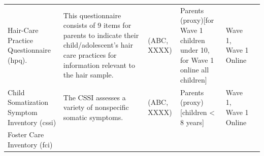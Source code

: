 \documentclass[]{book}
\begin{document}
\begin{longtable}[]{@{}llllll@{}}
\begin{minipage}[t]{0.18\columnwidth}\raggedright
Hair-Care Practice Questionnaire (hpq).\strut
\end{minipage} & \begin{minipage}[t]{0.18\columnwidth}\raggedright
This questionnaire consists of 9 items for parents to indicate their child/adolescent's hair care practices for information relevant to the hair sample.\strut
\end{minipage} & \begin{minipage}[t]{0.15\columnwidth}\raggedright
(ABC, XXXX)\strut
\end{minipage} & \begin{minipage}[t]{0.16\columnwidth}\raggedright
Parents (proxy){[}for Wave 1 children under 10, for Wave 1 online all children{]}\strut
\end{minipage} & \begin{minipage}[t]{0.06\columnwidth}\raggedright
Wave 1, Wave 1 Online\strut
\end{minipage} & \begin{minipage}[t]{0.10\columnwidth}\raggedright
\strut
\end{minipage}\tabularnewline
\begin{minipage}[t]{0.18\columnwidth}\raggedright
Child Somatization Symptom Inventory (cssi)\strut
\end{minipage} & \begin{minipage}[t]{0.18\columnwidth}\raggedright
The CSSI assesses a variety of nonspecific somatic symptoms.\strut
\end{minipage} & \begin{minipage}[t]{0.15\columnwidth}\raggedright
(ABC, XXXX)\strut
\end{minipage} & \begin{minipage}[t]{0.16\columnwidth}\raggedright
Parents (proxy){[}children \textless{} 8 years{]}\strut
\end{minipage} & \begin{minipage}[t]{0.06\columnwidth}\raggedright
Wave 1, Wave 1 Online\strut
\end{minipage} & \begin{minipage}[t]{0.10\columnwidth}\raggedright
\strut
\end{minipage}\tabularnewline
\begin{minipage}[t]{0.18\columnwidth}\raggedright
Foster Care Inventory (fci)\strut
\end{minipage} & \begin{minipage}[t]{0.18\columnwidth}\raggedright

\end{minipage}
\end{longtable}
\end{document}

